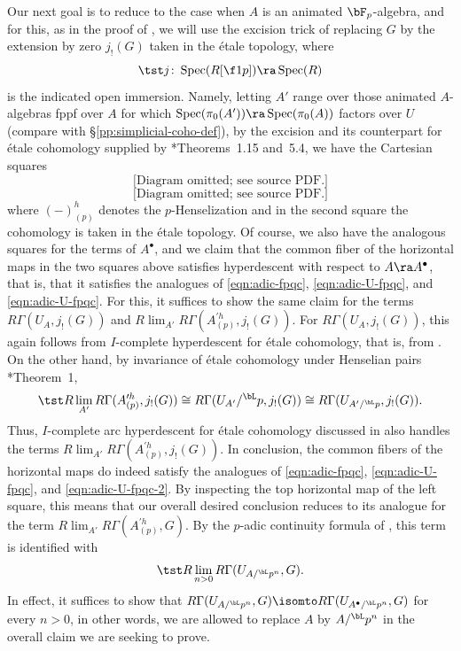 Our next goal is to reduce to the case when $A$ is an animated $\bF_p$-algebra, and for this, as in the proof of , we will use the excision trick of replacing $G$ by the extension by zero $j_!(G)$ taken in the \'{e}tale topology, where
\[
\tst j \colon \Spec(R[\f 1p]) \ra \Spec(R)
\]
is the indicated open immersion. Namely, letting $A'$ range over those animated $A$-algebras fppf over $A$ for which $\Spec(\pi_0(A')) \ra \Spec(\pi_0(A))$ factors over $U$ (compare with \S\ref{pp:simplicial-coho-def}), by the excision  and its counterpart for \'{e}tale cohomology supplied by \cite{BM20}*{Theorems~1.15 and~5.4}, we have the Cartesian squares
\[
\text{[Diagram omitted; see source PDF.]}
\]
\[
\text{[Diagram omitted; see source PDF.]}
\]
where $(-)^h_{(p)}$ denotes the $p$-Henselization and in the second square the cohomology is taken in the \'{e}tale topology. Of course, we also have the analogous squares for the terms of $A^\bullet$, and we claim that the common fiber of the horizontal maps in the two squares above satisfies hyperdescent with respect to $A \ra A^\bullet$, that is, that it satisfies the analogues of \eqref{eqn:adic-fpqc}, \eqref{eqn:adic-U-fpqc}, and \eqref{eqn:adic-U-fpqc}. For this, it suffices to show the same claim for the terms $R\Gamma(U_A, j_!(G))$ and $R\lim_{A'}R\Gamma(A^{\prime h}_{(p)}, j_!(G))$. For $R\Gamma(U_A, j_!(G))$, this again follows from $I$-complete hyperdescent for \'{e}tale cohomology, that is, from . On the other hand, by invariance of \'{e}tale cohomology under Henselian pairs \cite{Gab94a}*{Theorem~1},
\[
\tst R\lim_{A'}R\Gamma(A^{\prime h}_{(p)}, j_!(G)) \cong R\Gamma(U_{A'}/^\bL p, j_!(G)) \cong R\Gamma(U_{A'/^\bL p}, j_!(G)).
\]
Thus, $I$-complete arc hyperdescent for \'{e}tale cohomology discussed in  also handles the terms $R\lim_{A'}R\Gamma(A^{\prime h}_{(p)}, j_!(G))$. In conclusion, the common fibers of the horizontal maps do indeed satisfy the analogues of \eqref{eqn:adic-fpqc}, \eqref{eqn:adic-U-fpqc}, and \eqref{eqn:adic-U-fpqc-2}. By inspecting the top horizontal map of the left square, this means that our overall desired conclusion reduces to its analogue for the term $R\lim_{A'}R\Gamma(A^{\prime h}_{(p)}, G)$. By the $p$-adic continuity formula of , this term is identified with
\[
\tst R\lim_{n > 0} R\Gamma(U_{A/^\bL p^n}, G).
\]
In effect, it suffices to show that $R\Gamma(U_{A/^\bL p^n}, G) \isomto R\Gamma(U_{A^\bullet/^\bL p^n}, G)$ for every $n > 0$, in other words, we are allowed to replace $A$ by $A/^\bL p^n$ in the overall claim we are seeking to prove.




